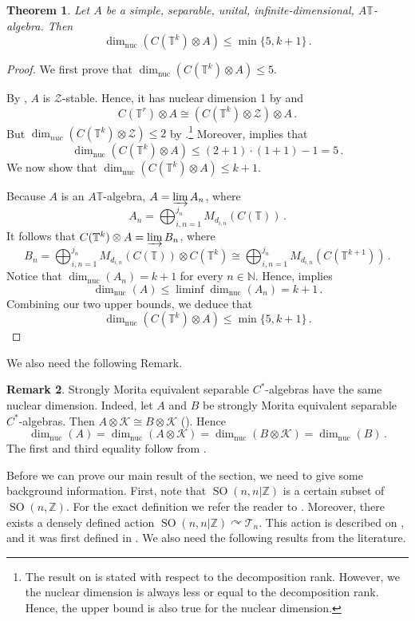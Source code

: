 \documentclass{amsart}
\newtheorem{theorem}{Theorem}[section]
\theoremstyle{definition}
\newtheorem{remark}[theorem]{Remark}
\newcommand{\Z}{\mathbb{Z}}
\newcommand{\N}{\mathbb{N}}
\newcommand{\TT}{\mathbb{T}}
\newcommand{\ZZ}{\mathcal{Z}}
\DeclareMathOperator{\nuc}{nuc}
\DeclareMathOperator{\SO}{SO}
\newcommand{\dimnuc}{\dim_{\nuc}}
\begin{document}
\begin{theorem}\label{upper bound for dim_nuc of commutative tensor classifiable}
  Let $A$ be a simple, separable, unital, infinite-dimensional, $A\TT$-algebra. Then $$\dimnuc(C(\TT^k)\otimes A)\leq \min\{5, k+1\}\,.$$
\end{theorem}
\begin{proof}
    We first prove that $\dimnuc(C(\TT^k)\otimes A)\leq 5$. \par
    By \cite[Corollary 3.1]{z-stability_ASH_simple}, $A$ is $\ZZ$-stable. Hence, it has nuclear dimension 1 by \cite[Theorem A]{dim_nuc_simple} and $$C(\TT^r)\otimes A\cong (C(\TT^k)\otimes \ZZ)\otimes A\,.$$
    But $\dim_{nuc}(C(\TT^k)\otimes \ZZ)\leq 2$ by \cite[Theorem 4.1]{nuclear_dimension_commutative_tensor_Z}.\footnote{The result on \cite{nuclear_dimension_commutative_tensor_Z} is stated with respect to the decomposition rank. However, we the nuclear dimension is always less or equal to the decomposition rank. Hence, the upper bound is also true for the nuclear dimension.} Moreover, \cite[Proposition 2.3(ii)]{WZ10} implies that
    $$\dimnuc(C(\TT^k)\otimes A)\leq (2+1)\cdot (1+1)-1=5\,.$$
    We now show that $\dimnuc(C(\TT^k)\otimes A)\leq k+1$. \par
    Because $A$ is an $A\TT$-algebra, $A=\varinjlim A_n$, where $$A_n=\bigoplus_{i,n=1}^{j_n} M_{d_{i,n}}(C(\TT))\,.$$
    It follows that $C(\TT^k)\otimes A=\varinjlim B_n$, where $$B_n=\bigoplus_{i,n=1}^{j_n} M_{d_{i,n}}(C(\TT))\otimes C(\TT^k)\cong \bigoplus_{i,n=1}^{j_n} M_{d_{i,n}}(C(\TT^{k+1}))\,.$$
    Notice that $\dimnuc(A_n)=k+1$ for every $n\in \N$. Hence, \cite[Proposition 2.3(iii)]{WZ10} implies
    $$\dimnuc(A)\leq \liminf \dimnuc(A_n)=k+1\,.$$
    Combining our two upper bounds, we deduce that
    $$\dimnuc(C(\TT^k)\otimes A)\leq \min\{5, k+1\}\,.$$
    
\end{proof}
We also need the following Remark.
\begin{remark}\label{dim_nuc_morita_equivalent}
    Strongly Morita equivalent separable $C^*$-algebras have the same nuclear dimension. Indeed, let $A$ and $B$ be strongly Morita equivalent separable $C^*$-algebras. Then $A\otimes \mathcal{K}\cong B\otimes \mathcal{K}$ (\cite{morita_equivalence_stable_isom}). Hence
    $$\dimnuc(A)=\dimnuc(A\otimes \mathcal{K})=\dimnuc(B\otimes \mathcal{K})=\dimnuc(B)\,.$$
    The first and third equality follow from \cite[Corollary 2.8(i)]{WZ10}.
\end{remark}
Before we can prove our main result of the section, we need to give some background information. First, note that $\SO(n,n|\Z)$ is a certain subset of $\SO(n,\Z)$. For the exact definition we refer the reader to \cite[p.8]{elliott2006moritaequivalencesmoothnoncommutative}. Moreover, there exists a densely defined action $\SO(n,n|\Z)\curvearrowright \mathcal{T}_n$. This action is described on \cite[p.8]{elliott2006moritaequivalencesmoothnoncommutative}, and it was first defined in \cite{action_of_skew_symmetric_matrices}. We also need the following results from the literature.
\end{document}

